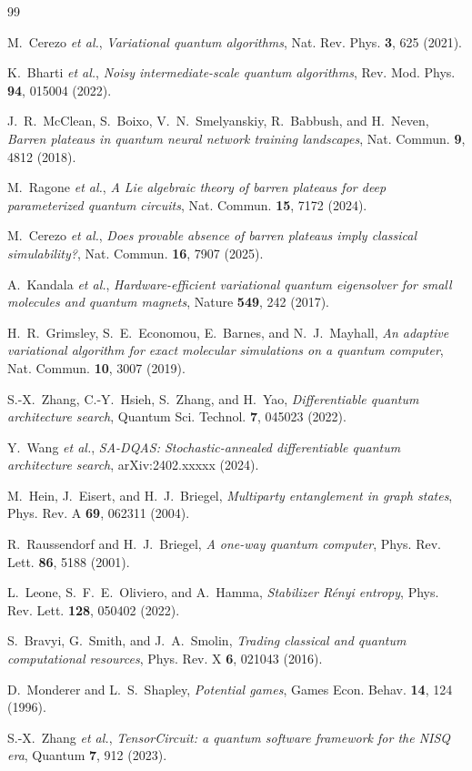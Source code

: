 \documentclass[prl,twocolumn,aps,superscriptaddress,showkeys,floatfix,nofootinbib]{revtex4-2}
\begin{document}
\begin{thebibliography}{99}

 M.~Cerezo \textit{et al.}, \textit{Variational quantum algorithms}, Nat. Rev. Phys. \textbf{3}, 625 (2021).

 K.~Bharti \textit{et al.}, \textit{Noisy intermediate-scale quantum algorithms}, Rev. Mod. Phys. \textbf{94}, 015004 (2022).

 J.~R.~McClean, S.~Boixo, V.~N.~Smelyanskiy, R.~Babbush, and H.~Neven, \textit{Barren plateaus in quantum neural network training landscapes}, Nat. Commun. \textbf{9}, 4812 (2018).

 M.~Ragone \textit{et al.}, \textit{A Lie algebraic theory of barren plateaus for deep parameterized quantum circuits}, Nat. Commun. \textbf{15}, 7172 (2024).

 M.~Cerezo \textit{et al.}, \textit{Does provable absence of barren plateaus imply classical simulability?}, Nat. Commun. \textbf{16}, 7907 (2025).

 A.~Kandala \textit{et al.}, \textit{Hardware-efficient variational quantum eigensolver for small molecules and quantum magnets}, Nature \textbf{549}, 242 (2017).

 H.~R.~Grimsley, S.~E.~Economou, E.~Barnes, and N.~J.~Mayhall, \textit{An adaptive variational algorithm for exact molecular simulations on a quantum computer}, Nat. Commun. \textbf{10}, 3007 (2019).

 S.-X.~Zhang, C.-Y.~Hsieh, S.~Zhang, and H.~Yao, \textit{Differentiable quantum architecture search}, Quantum Sci. Technol. \textbf{7}, 045023 (2022).

 Y.~Wang \textit{et al.}, \textit{SA-DQAS: Stochastic-annealed differentiable quantum architecture search}, arXiv:2402.xxxxx (2024).

 M.~Hein, J.~Eisert, and H.~J.~Briegel, \textit{Multiparty entanglement in graph states}, Phys. Rev. A \textbf{69}, 062311 (2004).

 R.~Raussendorf and H.~J.~Briegel, \textit{A one-way quantum computer}, Phys. Rev. Lett. \textbf{86}, 5188 (2001).

 L.~Leone, S.~F.~E.~Oliviero, and A.~Hamma, \textit{Stabilizer R\'enyi entropy}, Phys. Rev. Lett. \textbf{128}, 050402 (2022).

 S.~Bravyi, G.~Smith, and J.~A.~Smolin, \textit{Trading classical and quantum computational resources}, Phys. Rev. X \textbf{6}, 021043 (2016).

 D.~Monderer and L.~S.~Shapley, \textit{Potential games}, Games Econ. Behav. \textbf{14}, 124 (1996).

 S.-X.~Zhang \textit{et al.}, \textit{TensorCircuit: a quantum software framework for the NISQ era}, Quantum \textbf{7}, 912 (2023).

\end{thebibliography}
\end{document}
